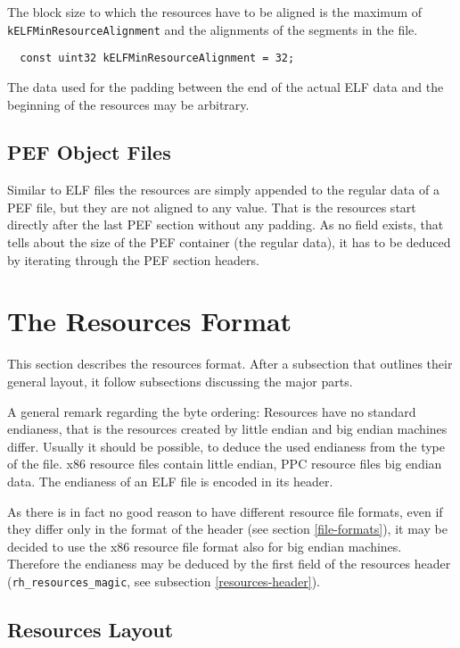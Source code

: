 \documentclass[12pt, a4paper]{article}
\newcommand{\code}[1]{{\tt #1}}
\begin{document}
The block size to which the resources have to be aligned is the maximum of
\code{kELFMinResourceAlignment} and the alignments of the segments in the file.
%
\begin{verbatim}
  const uint32 kELFMinResourceAlignment = 32;
\end{verbatim}
%
The data used for the padding between the end of the actual ELF data and the
beginning of the resources may be arbitrary.


\subsection{PEF Object Files}

Similar to ELF files the resources are simply appended to the regular data of
a PEF file, but they are not aligned to any value. That is the resources
start directly after the last PEF section without any padding.
As no field exists, that tells about the size of the PEF container (the
regular data), it has to be deduced by iterating through the PEF section
headers.



\section{The Resources Format}
\label{resources-format}

This section describes the resources format. After a subsection that outlines
their general layout, it follow subsections discussing the major parts.

A general remark regarding the byte ordering: Resources have no standard
endianess, that is the resources created by little endian and big endian
machines differ. Usually it should be possible, to deduce the used endianess
from the type of the file. x86 resource files contain little endian, PPC
resource files big endian data. The endianess of an ELF file is encoded in
its header.

As there is in fact no good reason to have different resource file formats,
even if they differ only in the format of the header (see section
\ref{file-formats}), it may be decided to use the x86 resource file format
also for big endian machines. Therefore the endianess may be deduced by the
first field of the resources header (\code{rh\_resources\_magic}, see
subsection \ref{resources-header}).


\subsection{Resources Layout}
\end{document}
